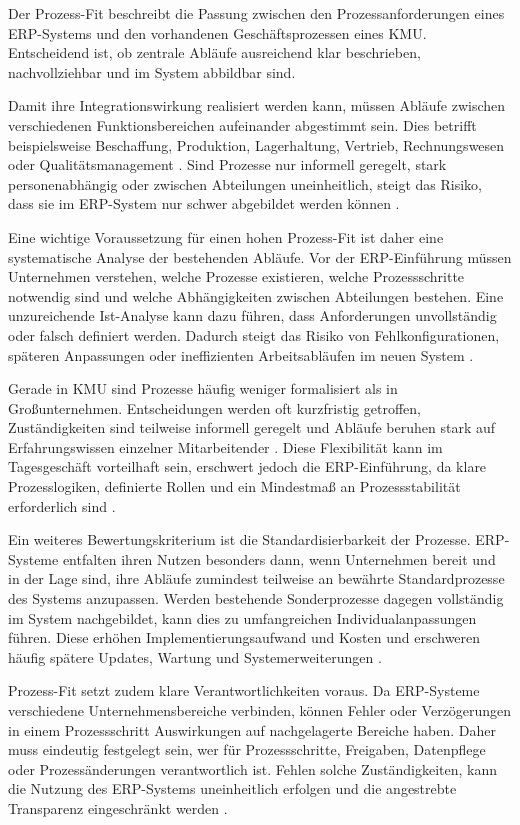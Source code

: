 
Der Prozess-Fit beschreibt die Passung zwischen den Prozessanforderungen eines ERP-Systems und den vorhandenen 
Geschäftsprozessen eines KMU. Entscheidend ist, ob zentrale Abläufe ausreichend klar beschrieben, nachvollziehbar 
und im System abbildbar sind. 

Damit ihre Integrationswirkung realisiert werden kann, müssen Abläufe zwischen verschiedenen Funktionsbereichen 
aufeinander abgestimmt sein. Dies betrifft beispielsweise Beschaffung, Produktion, Lagerhaltung, Vertrieb, 
Rechnungswesen oder Qualitätsmanagement \parencite{Alaskari2021,Leyh2015}. Sind Prozesse nur informell geregelt, 
stark personenabhängig oder zwischen Abteilungen uneinheitlich, steigt das Risiko, dass sie im ERP-System nur schwer 
abgebildet werden können \parencite{Jha2008}.

Eine wichtige Voraussetzung für einen hohen Prozess-Fit ist daher eine systematische Analyse der bestehenden Abläufe. 
Vor der ERP-Einführung müssen Unternehmen verstehen, welche Prozesse existieren, welche Prozessschritte notwendig sind 
und welche Abhängigkeiten zwischen Abteilungen bestehen. Eine unzureichende Ist-Analyse kann dazu führen, dass Anforderungen 
unvollständig oder falsch definiert werden. Dadurch steigt das Risiko von Fehlkonfigurationen, späteren Anpassungen oder 
ineffizienten Arbeitsabläufen im neuen System \parencite{Leyh2015,Leyh2019}.

Gerade in KMU sind Prozesse häufig weniger formalisiert als in Großunternehmen. Entscheidungen werden oft kurzfristig 
getroffen, Zuständigkeiten sind teilweise informell geregelt und Abläufe beruhen stark auf Erfahrungswissen einzelner 
Mitarbeitender \parencite{Barbieri2025}. Diese Flexibilität kann im Tagesgeschäft vorteilhaft sein, erschwert jedoch die 
ERP-Einführung, da klare Prozesslogiken, definierte Rollen und ein Mindestmaß an Prozessstabilität erforderlich sind 
\parencite{Alaskari2021,Leyh2015}.

Ein weiteres Bewertungskriterium ist die Standardisierbarkeit der Prozesse. ERP-Systeme entfalten ihren Nutzen besonders 
dann, wenn Unternehmen bereit und in der Lage sind, ihre Abläufe zumindest teilweise an bewährte Standardprozesse des 
Systems anzupassen. Werden bestehende Sonderprozesse dagegen vollständig im System nachgebildet, kann dies zu umfangreichen 
Individualanpassungen führen. Diese erhöhen Implementierungsaufwand und Kosten und erschweren häufig spätere Updates, 
Wartung und Systemerweiterungen \parencite{Leyh2015,Barbieri2025}.

Prozess-Fit setzt zudem klare Verantwortlichkeiten voraus. Da ERP-Systeme verschiedene Unternehmensbereiche verbinden, 
können Fehler oder Verzögerungen in einem Prozessschritt Auswirkungen auf nachgelagerte Bereiche haben. Daher muss eindeutig 
festgelegt sein, wer für Prozessschritte, Freigaben, Datenpflege oder Prozessänderungen verantwortlich ist. Fehlen solche 
Zuständigkeiten, kann die Nutzung des ERP-Systems uneinheitlich erfolgen und die angestrebte Transparenz eingeschränkt werden 
\parencite{Leyh2015,Leyh2019,Jha2008}.

